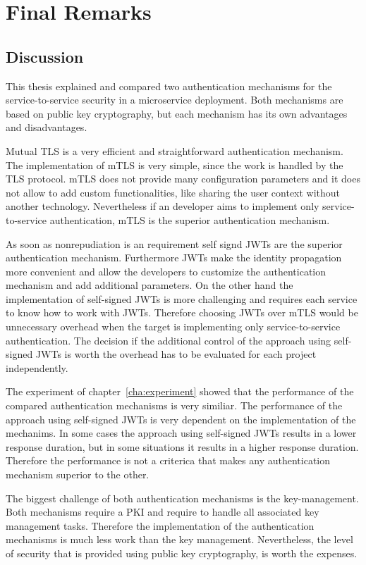 \chapter{Final Remarks}
\label{cha:final_remarks}

\section{Discussion}
This thesis explained and compared two authentication mechanisms for the service-to-service security in a microservice deployment.
Both mechanisms are based on public key cryptography, but each mechanism has its own advantages and disadvantages.

Mutual TLS is a very efficient and straightforward authentication mechanism.
The implementation of mTLS is very simple, since the work is handled by the TLS protocol.
mTLS does not provide many configuration parameters and it does not allow to add custom functionalities, like sharing the user context without another technology.
Nevertheless if an developer aims to implement only service-to-service authentication, mTLS is the superior authentication mechanism.

As soon as nonrepudiation is an requirement self signd JWTs are the superior authentication mechanism.
Furthermore JWTs make the identity propagation more convenient and allow the developers to customize the authentication mechanism and add additional parameters.
On the other hand the implementation of self-signed JWTs is more challenging and requires each service to know how to work with JWTs.
Therefore choosing JWTs over mTLS would be unnecessary overhead when the target is implementing only service-to-service authentication.
The decision if the additional control of the approach using self-signed JWTs is worth the overhead has to be evaluated for each project independently.

The experiment of chapter~\ref{cha:experiment} showed that the performance of the compared authentication mechanisms is very similiar.
The performance of the approach using self-signed JWTs is very dependent on the implementation of the mechanims.
In some cases the approach using self-signed JWTs results in a lower response duration, but in some situations it results in a higher response duration.
Therefore the performance is not a criterica that makes any authentication mechanism superior to the other.

The biggest challenge of both authentication mechanisms is the key-management.
Both mechanisms require a PKI and require to handle all associated key management tasks.
Therefore the implementation of the authentication mechanisms is much less work than the key management.
Nevertheless, the level of security that is provided using public key cryptography, is worth the expenses.

